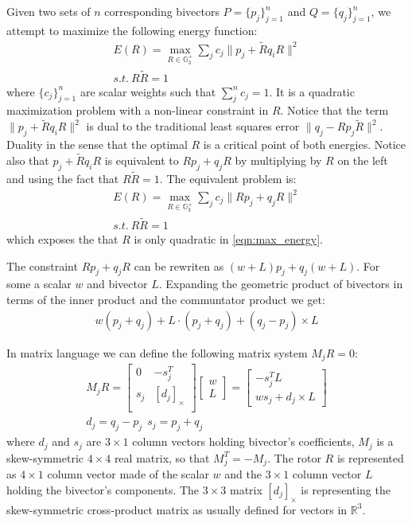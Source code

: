 \documentclass{birkjour}
\numberwithin{equation}{section}
\begin{document}
Given two sets of $n$ corresponding bivectors $P = \{p_j\}_{j=1}^n$ and $Q = \{q_j\}_{j=1}^n$, we attempt to maximize the following energy function:
\begin{eqnarray}
	E(R) = \max_{R \in \mathbb{G}^{+}_3 } \sum_j { c_{j} \|p_j + \tilde R q_i R \|^2 }\\
	s.t. \ R \tilde R = 1 \nonumber
\end{eqnarray}
where $\{c_{j}\}_{j=1}^n$ are scalar weights such that $\sum_j^n{c_j} = 1$. It is a quadratic maximization problem with a non-linear constraint in $R$. Notice that the term $\|p_j + \tilde R q_i R\|^2$ is dual to the traditional least squares error $\|q_j - R p_j \tilde R\|^2$. Duality in the sense that the optimal $R$ is a critical point of both energies.
Notice also that $p_j + \tilde R q_i R$ is equivalent to $R p_j + q_j R$ by multiplying by $R$ on the left and using the fact that $R \tilde R = 1$. The equivalent problem is:
\begin{eqnarray}
	\label{eqn:max_energy}
	E(R) = \max_{R \in \mathbb{G}^{+}_3 } \sum_j { c_{j} \|R p_j + q_j R\|^2 }\\
	s.t. \ R \tilde R = 1 \nonumber
\end{eqnarray}
which exposes the that $R$ is only quadratic in \ref{eqn:max_energy}.

The constraint $R p_j + q_j R$ can be rewriten as $(w + L) p_j  + q_j (w + L)$. For some a scalar $w$ and bivector $L$. Expanding the geometric product of bivectors in terms of the inner product and the communtator product we get:
\begin{eqnarray}
	w  (p_j + q_j) + L \cdot (p_j + q_j)  + (q_j - p_j) \times L
\end{eqnarray}

In matrix language we can define the following matrix system $M_j R = 0$:
\begin{eqnarray}
	M_j R =
	\left[\begin{array}{cc}
		0      &       -s_j^T \\
		s_j    &   \left[ d_j \right]_\times \\
	\end{array}\right]
	\left[\begin{array}{c} 
		w \\
		L
	\end{array}\right] = 
	\left[\begin{array}{c}
		-s_j^T L \\
		w s_j + d_j \times L 
	\end{array}\right]\\
	d_j = q_j - p_j \ \ s_j = p_j + q_j  \nonumber
\end{eqnarray}
where $d_j$ and $s_j$ are $3 \times 1$ column vectors holding bivector's coefficients, $M_j$ is a skew-symmetric $4\times 4$ real matrix, so that $M_j^T = -M_j$. The rotor $R$ is represented as $4 \times 1$ column vector made of the scalar $w$ and the $3 \times 1$ column vector $L$ holding the bivector's components. The $3\times 3$ matrix $\left[ d_j \right]_\times$ is representing the skew-symmetric cross-product matrix as usually defined for vectors in $\mathbb R^3$.
\end{document}
